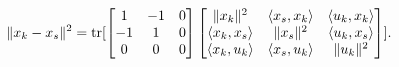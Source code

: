 \begin{equation}
	\|x_k - x_s\|^2 = \operatorname{\mathrm{tr}}[\begin{bmatrix}1 &-1 &0\\-1 & 1 & 0\\0 & 0 & 0\end{bmatrix}\begin{bmatrix}\|x_k\|^2 & \langle x_s, x_k \rangle & \langle u_k, x_k \rangle \\ \langle x_k, x_s \rangle & \|x_s\|^2 & \langle u_k, x_s \rangle \\ \langle x_k, u_k \rangle & \langle x_s, u_k \rangle & \|u_k\|^2\end{bmatrix}].
\end{equation}
